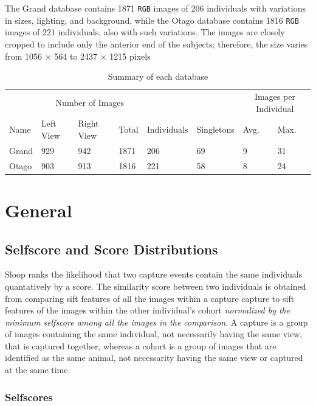 The Grand database contains 1871 \texttt{RGB} images of 206 individuals with variations in sizes, lighting, and background, while the Otago database contains 1816 \texttt{RGB} images of 221 individuals, also with such variations. The images are closely cropped to include only the anterior end of the subjects; therefore, the size varies from 1056 $\times$ 564 to 2437 $\times$ 1215 pixels

\begin{table}[t]
\captionsetup{justification=centering}
  \caption{Summary of each database}
  \label{database-table}
  \centering
  \begin{tabular}{llllllll}
    \toprule
    & \multicolumn{3}{c}{Number of Images} & & & \multicolumn{2}{c}{Images per Individual} \\
    \cmidrule{2-4}
    \cmidrule{7-8}
    Name & Left View & Right View & Total & Individuals & Singletons & Avg. & Max. \\
    \midrule
    Grand & 929 & 942 & 1871 & 206  & 69 & 9 & 31 \\
    Otago & 903 & 913 & 1816 & 221  & 58 & 8 & 24 \\
    \bottomrule
  \end{tabular}
\end{table}


\section{General}

\subsection{Selfscore and Score Distributions}

Sloop ranks the likelihood that two capture events contain the same individuals quantatively by a score. The similarity score between two individuals is obtained from comparing sift features of all the images within a capture capture to sift features of the images within the other individual's cohort \emph{normalized by the minimum selfscore among all the images in the comparison}. A capture is a group of images containing the same individual, not necessarily having the same view, that is captured together, whereas a cohort is a group of images that are identified as the same animal, not necessarity having the same view or captured at the same time.

\subsubsection{Selfscores}

